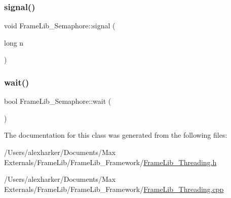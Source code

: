 \mbox{\label{class_frame_lib___semaphore_ab46387d91374abb71cae7e2874641119}} 
\subsubsection{\texorpdfstring{signal()}{signal()}}
{\footnotesize\ttfamily void Frame\+Lib\+\_\+\+Semaphore\+::signal (\begin{DoxyParamCaption}\item[{long}]{n }\end{DoxyParamCaption})}

\mbox{\label{class_frame_lib___semaphore_a87e8ba7aa4aba472e9d05c85f0170920}} 
\subsubsection{\texorpdfstring{wait()}{wait()}}
{\footnotesize\ttfamily bool Frame\+Lib\+\_\+\+Semaphore\+::wait (\begin{DoxyParamCaption}{ }\end{DoxyParamCaption})}



The documentation for this class was generated from the following files\+:\begin{DoxyCompactItemize}
\item 
/\+Users/alexharker/\+Documents/\+Max Externals/\+Frame\+Lib/\+Frame\+Lib\+\_\+\+Framework/\hyperlink{_frame_lib___threading_8h}{Frame\+Lib\+\_\+\+Threading.\+h}\item 
/\+Users/alexharker/\+Documents/\+Max Externals/\+Frame\+Lib/\+Frame\+Lib\+\_\+\+Framework/\hyperlink{_frame_lib___threading_8cpp}{Frame\+Lib\+\_\+\+Threading.\+cpp}\end{DoxyCompactItemize}
